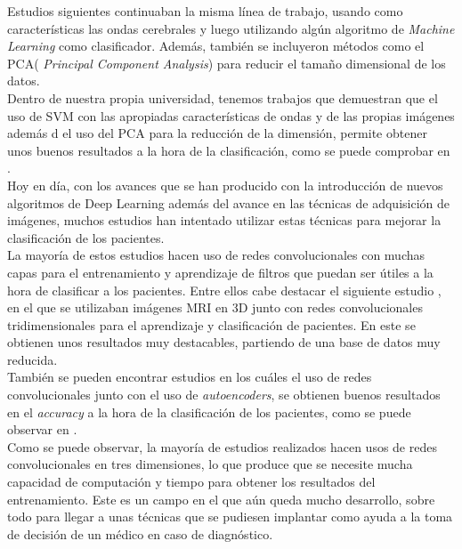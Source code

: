 Estudios siguientes continuaban la misma línea de trabajo, usando como características las ondas cerebrales y luego utilizando algún algoritmo de \textit{Machine Learning} como clasificador. Además, también se incluyeron métodos como el PCA( \textit{Principal Component Analysis}) para reducir el tamaño dimensional de los datos. \cite{Lee:2009:CMF:1697406.1697471}\\

Dentro de nuestra propia universidad, tenemos trabajos que demuestran que el uso de SVM con las apropiadas características de ondas y de las propias imágenes además d el uso del PCA para la reducción de la dimensión, permite obtener unos buenos resultados a la hora de la clasificación, como se puede comprobar en \cite{jaramillo}.\\

Hoy en día, con los avances que se han producido con la introducción de nuevos algoritmos de Deep Learning además del avance en las técnicas de adquisición de imágenes, muchos estudios han intentado utilizar estas técnicas para mejorar la clasificación de los pacientes.\\

La mayoría de estos estudios hacen uso de redes convolucionales con muchas capas para el entrenamiento y aprendizaje de filtros que puedan ser útiles a la hora de clasificar a los pacientes. Entre ellos cabe destacar el siguiente estudio \cite{residualVGG}, en el que se utilizaban imágenes MRI en 3D junto con redes convolucionales tridimensionales para el aprendizaje y clasificación de pacientes. En este se obtienen unos resultados muy destacables, partiendo de una base de datos muy reducida.\\

También se pueden encontrar estudios en los cuáles el uso de redes convolucionales junto con el uso de \textit{autoencoders}, se obtienen buenos resultados en el \textit{accuracy} a la hora de la clasificación de los pacientes, como se puede observar en \cite{DBLP:journals/corr/Hosseini-AslKE16}.\\

Como se puede observar, la mayoría de estudios realizados hacen usos de redes convolucionales en tres dimensiones, lo que produce que se necesite mucha capacidad de computación y tiempo para obtener los resultados del entrenamiento. Este es un campo en el que aún queda mucho desarrollo, sobre todo para llegar a unas técnicas que se pudiesen implantar como ayuda a la toma de decisión de un médico en caso de diagnóstico.\\
